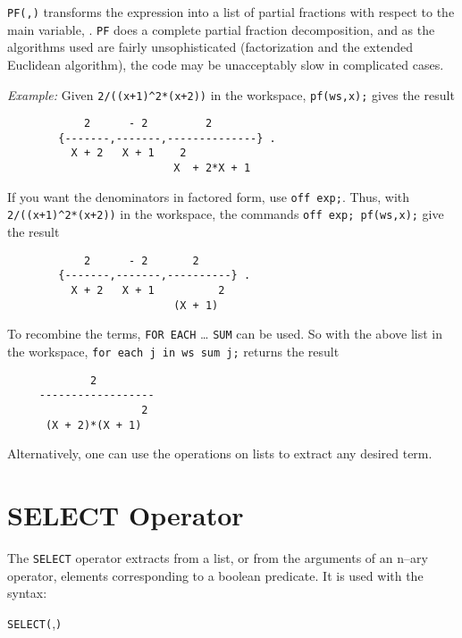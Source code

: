 \texttt{PF(,)} transforms the expression  into
a list of partial fractions with respect to the main variable, .
\texttt{PF}
does a complete partial fraction decomposition, and as the algorithms used
are fairly unsophisticated (factorization and the extended Euclidean
algorithm), the code may be unacceptably slow in complicated cases.

\textit{Example:}
Given \texttt{2/((x+1)\textasciicircum2*(x+2))} in the workspace,
\texttt{pf(ws,x);} gives the result
\begin{samepage}
\begin{verbatim}
            2      - 2         2
        {-------,-------,--------------} .
          X + 2   X + 1    2
                          X  + 2*X + 1
\end{verbatim}
\end{samepage}

If you want the denominators in factored form, use \texttt{off exp;}.
Thus, with \texttt{2/((x+1)\textasciicircum2*(x+2))} in the workspace,
the commands \texttt{off exp; pf(ws,x);} give the result
\begin{verbatim}
            2      - 2       2
        {-------,-------,----------} .
          X + 2   X + 1          2
                          (X + 1)
\end{verbatim}

To recombine the terms, \texttt{FOR EACH} \ldots{} \texttt{SUM} can be used.  
So with the above list in the workspace, 
\texttt{for each j in ws sum j;} returns the result
\begin{verbatim}
             2
     ------------------
                     2
      (X + 2)*(X + 1)
\end{verbatim}

Alternatively, one can use the operations on lists to extract any desired
term.


\section{SELECT Operator}
\hypertarget{operator:SELECT}{}

The \texttt{SELECT} operator extracts from a list,
or from the arguments of an n--ary operator, elements corresponding
to a boolean predicate. It is used with the syntax:
\begin{syntax}
  \texttt{SELECT(},\texttt{)}
\end{syntax}


